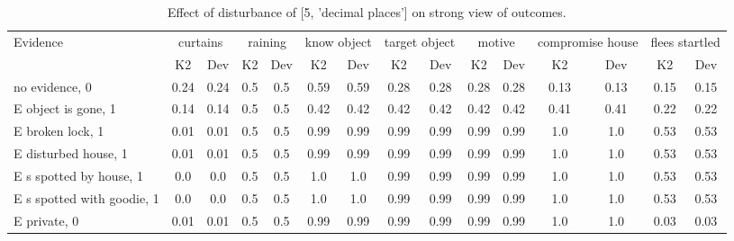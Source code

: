 \begin{table}\begin{tabular}{l|cc|cc|cc|cc|cc|cc|cc}\toprule\multirow{2}{*}{Evidence} & \multicolumn{2}{c}{curtains}& \multicolumn{2}{c}{raining}& \multicolumn{2}{c}{know object}& \multicolumn{2}{c}{target object}& \multicolumn{2}{c}{motive}& \multicolumn{2}{c}{compromise house}& \multicolumn{2}{c}{flees startled}\\& {K2} & {Dev}& {K2} & {Dev}& {K2} & {Dev}& {K2} & {Dev}& {K2} & {Dev}& {K2} & {Dev}& {K2} & {Dev}\\\midrule
no evidence, 0 & 0.24&0.24&0.5&0.5&0.59&0.59&0.28&0.28&0.28&0.28&0.13&0.13&0.15&0.15\\E object is gone, 1 & 0.14&0.14&0.5&0.5&0.42&0.42&0.42&0.42&0.42&0.42&0.41&0.41&0.22&0.22\\E broken lock, 1 & 0.01&0.01&0.5&0.5&0.99&0.99&0.99&0.99&0.99&0.99&1.0&1.0&0.53&0.53\\E disturbed house, 1 & 0.01&0.01&0.5&0.5&0.99&0.99&0.99&0.99&0.99&0.99&1.0&1.0&0.53&0.53\\E s spotted by house, 1 & 0.0&0.0&0.5&0.5&1.0&1.0&0.99&0.99&0.99&0.99&1.0&1.0&0.53&0.53\\E s spotted with goodie, 1 & 0.0&0.0&0.5&0.5&1.0&1.0&0.99&0.99&0.99&0.99&1.0&1.0&0.53&0.53\\E private, 0 & 0.01&0.01&0.5&0.5&0.99&0.99&0.99&0.99&0.99&0.99&1.0&1.0&0.03&0.03\\\bottomrule\end{tabular}\caption{Effect of disturbance of [5, 'decimal places'] on strong view of outcomes.}\end{table}